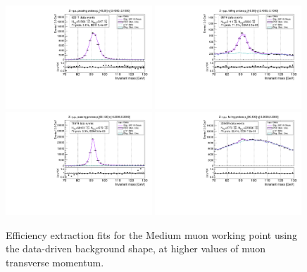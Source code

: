 {\begin{figure}
\label{fig:ZmmNominalFits1}
\end{figure}
\begin{figure}
\centering
\includegraphics[width=0.49\textwidth]{figures/Zmm_RecoTemplate_BkgLPi_pass_ptBin7_etaBin0.pdf}
\includegraphics[width=0.49\textwidth]{figures/Zmm_RecoTemplate_BkgLPi_fail_ptBin7_etaBin0.pdf}
\includegraphics[width=0.49\textwidth]{figures/Zmm_RecoTemplate_BkgLPi_pass_ptBin10_etaBin6.pdf}
\includegraphics[width=0.49\textwidth]{figures/Zmm_RecoTemplate_BkgLPi_fail_ptBin10_etaBin6.pdf}
\caption{Efficiency extraction fits for the Medium muon working point using the data-driven background shape, at higher values of muon transverse momentum.}
\label{fig:ZmmNominalFits2}
\end{figure}

}
